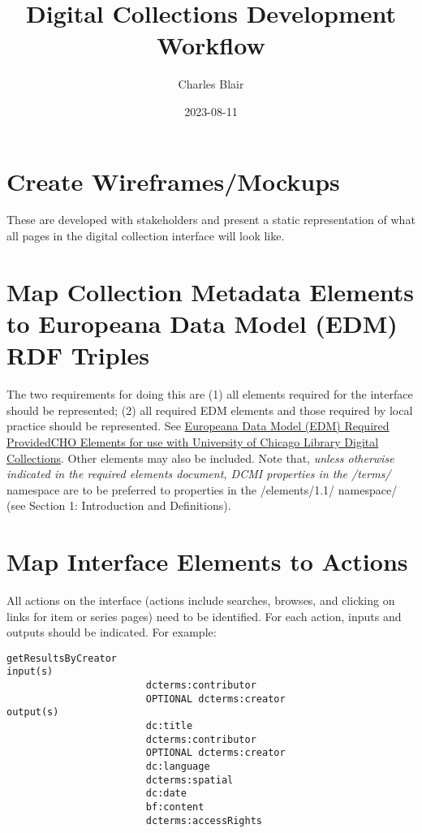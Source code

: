 \documentclass[11pt]{article}
\author{Charles Blair}
\date{2023-08-11}
\title{Digital Collections Development Workflow}
\begin{document}
\maketitle
\tableofcontents


\section{Create Wireframes/Mockups}
\label{sec:org3eee162}
These are developed with stakeholders and present a static representation of what all pages in the digital collection interface will look like.

\section{Map Collection Metadata Elements to Europeana Data Model (EDM) RDF Triples}
\label{sec:org18110c3}
The two requirements for doing this are (1) all elements required for the interface should be represented; (2) all required EDM elements and those required by local practice should be represented. See \href{https:/dldc.lib.uchicago.edu/local/ldr/required.pdf}{Europeana Data Model (EDM) Required ProvidedCHO Elements for use with University of Chicago Library Digital Collections}. Other elements may also be included. Note that, \emph{unless otherwise indicated in the required elements document, DCMI properties in the /terms/} namespace are to be preferred to properties in the /elements/1.1/ namespace/ (see Section 1: Introduction and Definitions).

\section{Map Interface Elements to Actions}
\label{sec:org45b4084}
All actions on the interface (actions include searches, browses, and clicking on links for item or series pages) need to be identified. For each action, inputs and outputs should be indicated. For example:

\begin{verbatim}
getResultsByCreator
input(s)
                        dcterms:contributor
                        OPTIONAL dcterms:creator
output(s)
                        dc:title
                        dcterms:contributor
                        OPTIONAL dcterms:creator
                        dc:language
                        dcterms:spatial
                        dc:date
                        bf:content
                        dcterms:accessRights
\end{verbatim}
\end{document}
